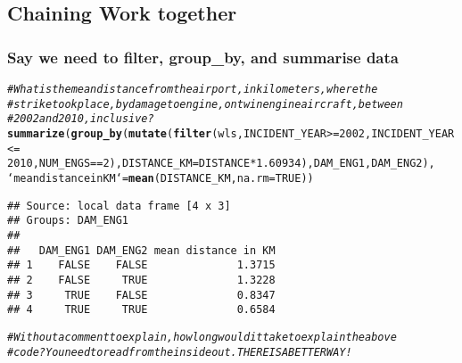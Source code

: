 \documentclass{beamer}\usepackage[]{graphicx}\usepackage[]{color}
\makeatletter
\newcommand{\hlnum}[1]{\textcolor[rgb]{0.686,0.059,0.569}{#1}}%
\newcommand{\hlcom}[1]{\textcolor[rgb]{0.678,0.584,0.686}{\textit{#1}}}%
\newcommand{\hlopt}[1]{\textcolor[rgb]{0,0,0}{#1}}%
\newcommand{\hlstd}[1]{\textcolor[rgb]{0.345,0.345,0.345}{#1}}%
\newcommand{\hlkwc}[1]{\textcolor[rgb]{0.333,0.667,0.333}{#1}}%
\newcommand{\hlkwd}[1]{\textcolor[rgb]{0.737,0.353,0.396}{\textbf{#1}}}%
\newenvironment{kframe}{%
 \def\at@end@of@kframe{}%
 \ifinner\ifhmode%
  \def\at@end@of@kframe{\end{minipage}}%
  \begin{minipage}{\columnwidth}%
 \fi\fi%
 \def\FrameCommand##1{\hskip\@totalleftmargin \hskip-\fboxsep
 \colorbox{shadecolor}{##1}\hskip-\fboxsep
     \hskip-\linewidth \hskip-\@totalleftmargin \hskip\columnwidth}%
 \MakeFramed {\advance\hsize-\width
   \@totalleftmargin\z@ \linewidth\hsize
   \@setminipage}}%
 {\par\unskip\endMakeFramed%
 \at@end@of@kframe}
\newenvironment{knitrout}{}{} %
\makeatother
\begin{document}
\subsection{Chaining Work together}%
\begin{frame}[fragile]
  \frametitle{Say we need to filter, group\_by, and
  summarise data}
\begin{knitrout}\footnotesize
{}\color{fgcolor}\begin{kframe}
\begin{alltt}
\hlcom{# What is the mean distance from the airport, in kilometers, where the}
\hlcom{# strike took place, by damage to engine, on twin engine aircraft, between}
\hlcom{# 2002 and 2010, inclusive?}
\hlkwd{summarize}\hlstd{(}\hlkwd{group_by}\hlstd{(}\hlkwd{mutate}\hlstd{(}\hlkwd{filter}\hlstd{(wls, INCIDENT_YEAR} \hlopt{>=} \hlnum{2002}\hlstd{, INCIDENT_YEAR} \hlopt{<=}
    \hlnum{2010}\hlstd{, NUM_ENGS} \hlopt{==} \hlnum{2}\hlstd{),} \hlkwc{DISTANCE_KM} \hlstd{= DISTANCE} \hlopt{*} \hlnum{1.60934}\hlstd{), DAM_ENG1, DAM_ENG2),}
    \hlkwc{`mean distance in KM`} \hlstd{=} \hlkwd{mean}\hlstd{(DISTANCE_KM,} \hlkwc{na.rm} \hlstd{=} \hlnum{TRUE}\hlstd{))}
\end{alltt}
\begin{verbatim}
## Source: local data frame [4 x 3]
## Groups: DAM_ENG1
## 
##   DAM_ENG1 DAM_ENG2 mean distance in KM
## 1    FALSE    FALSE              1.3715
## 2    FALSE     TRUE              1.3228
## 3     TRUE    FALSE              0.8347
## 4     TRUE     TRUE              0.6584
\end{verbatim}
\begin{alltt}
\hlcom{# Without a comment to explain, how long would it take to explain the above}
\hlcom{# code?  You need to read from the inside out.  THERE IS A BETTER WAY!}
\end{alltt}
\end{kframe}
\end{knitrout}
\end{frame} 
\end{document}
